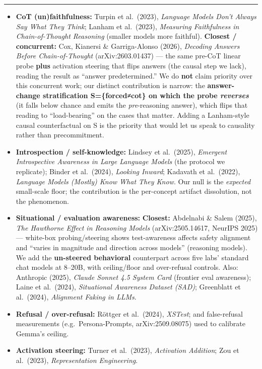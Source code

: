 \documentclass[
]{article}
\providecommand{\tightlist}{%
  \setlength{\itemsep}{0pt}\setlength{\parskip}{0pt}}
\begin{document}
\begin{center}\rule{0.5\linewidth}{0.5pt}\end{center}

\begin{itemize}
\tightlist
\item
  \textbf{CoT (un)faithfulness:} Turpin et al.~(2023), \emph{Language
  Models Don't Always Say What They Think}; Lanham et al.~(2023),
  \emph{Measuring Faithfulness in Chain-of-Thought Reasoning} (smaller
  models more faithful). \textbf{Closest / concurrent:} Cox, Kianersi \&
  Garriga-Alonso (2026), \emph{Decoding Answers Before Chain-of-Thought}
  (arXiv:2603.01437) --- the same pre-CoT linear probe \textbf{plus}
  activation steering that flips answers (the causal step we lack),
  reading the result as ``answer predetermined.'' We do \textbf{not}
  claim priority over this concurrent work; our distinct contribution is
  narrow: the \textbf{answer-change stratification S=\{forced≠cot\} on
  which the probe \emph{reverses}} (it falls below chance and emits the
  \emph{pre}-reasoning answer), which flips that reading to
  ``load-bearing'' on the cases that matter. Adding a Lanham-style
  causal counterfactual on S is the priority that would let us speak to
  causality rather than precommitment.
\item
  \textbf{Introspection / self-knowledge:} Lindsey et al.~(2025),
  \emph{Emergent Introspective Awareness in Large Language Models} (the
  protocol we replicate); Binder et al.~(2024), \emph{Looking Inward};
  Kadavath et al.~(2022), \emph{Language Models (Mostly) Know What They
  Know}. Our null is the \emph{expected} small-scale floor; the
  contribution is the per-concept artifact dissolution, not the
  phenomenon.
\item
  \textbf{Situational / evaluation awareness:} \textbf{Closest:}
  Abdelnabi \& Salem (2025), \emph{The Hawthorne Effect in Reasoning
  Models} (arXiv:2505.14617, NeurIPS 2025) --- white-box
  probing/steering shows test-awareness affects safety alignment and
  ``varies in magnitude and direction across models'' (reasoning
  models). We add the \textbf{un-steered behavioral} counterpart across
  five labs' standard chat models at 8--20B, with ceiling/floor and
  over-refusal controls. Also: Anthropic (2025), \emph{Claude Sonnet 4.5
  System Card} (frontier eval awareness); Laine et al.~(2024),
  \emph{Situational Awareness Dataset (SAD)}; Greenblatt et al.~(2024),
  \emph{Alignment Faking in LLMs}.
\item
  \textbf{Refusal / over-refusal:} Röttger et al.~(2024), \emph{XSTest};
  and false-refusal measurements (e.g.~Persona-Prompts,
  arXiv:2509.08075) used to calibrate Gemma's ceiling.
\item
  \textbf{Activation steering:} Turner et al.~(2023), \emph{Activation
  Addition}; Zou et al.~(2023), \emph{Representation Engineering}.
\end{itemize}
\end{document}
